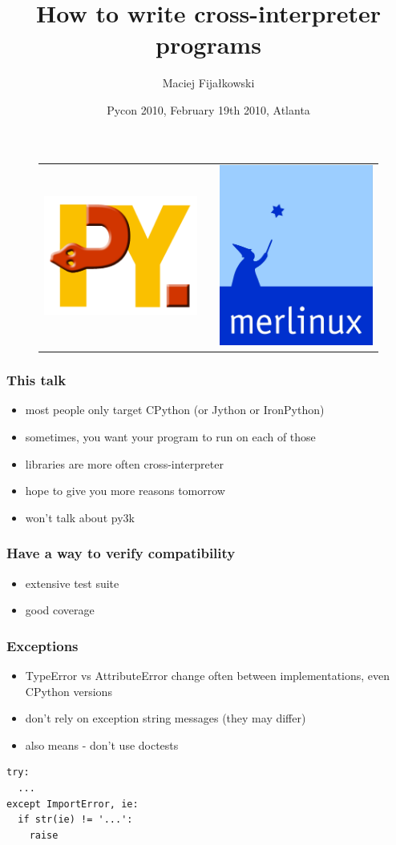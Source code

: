 \documentclass[utf8x, 14pt]{beamer}
\title{How to write cross-interpreter programs}
\author{Maciej Fijałkowski}
\institute[merlinux GmbH]
{ merlinux GmbH }
\date{Pycon 2010, February 19th 2010, Atlanta}
\begin{document}
\begin{frame}
  \titlepage
  \begin{figure}
    \begin{tabular}{c c c}
    \includegraphics[width=.20\textwidth]{../common/pypy-logo.png}
    &
    \hspace{2cm}
    &
    \includegraphics[width=.18\textwidth]{../common/merlinux-logo.png}
    \end{tabular}
  \end{figure}
\end{frame}

\begin{frame}
  \frametitle{This talk}
  \begin{itemize}
    \item most people only target CPython (or Jython or IronPython)
    \item sometimes, you want your program to run on each of those
    \item libraries are more often cross-interpreter
      \pause
    \item hope to give you more reasons tomorrow
      \pause
    \item won't talk about py3k
  \end{itemize}
\end{frame}

\begin{frame}
  \frametitle{Have a way to verify compatibility}
  \begin{itemize}
    \item extensive test suite
    \item good coverage
  \end{itemize}
\end{frame}

\begin{frame}[fragile]
  \frametitle{Exceptions}
  \begin{itemize}
    \item TypeError vs AttributeError change often between implementations,
      even CPython versions
    \item don't rely on exception string messages (they may differ)
    \item also means - don't use doctests
  \end{itemize}
  \begin{verbatim}
try:
  ...
except ImportError, ie:
  if str(ie) != '...':
    raise
  \end{verbatim}
\end{frame}
\end{document}
